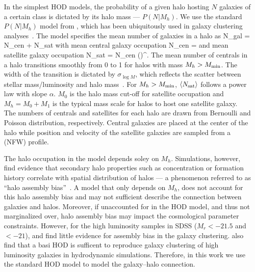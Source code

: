 In the simplest HOD models, the probability of a given halo hosting $N$ galaxies 
of a certain class is dictated by its halo mass --- $P(N|M_h)$.%
We use the standard $P(N|M_h)$ model from \cite{zheng2007}, which has been 
ubiquitously used in galaxy clustering analyses~\citep[\emph{e.g.}][]{sinha2018}. 
The model specifies the mean number of galaxies in a halo as
\beq
\langle N_{\rm gal} \rangle = \langle N_{\rm cen} \rangle + \langle N_{\rm sat} \rangle
\eeq
with mean central galaxy occupation
\beq \label{eq:Ncen}
\langle N_{\rm cen} \rangle  = 
\eeq
and mean satellite galaxy occupation
\beq \label{eq:Nsat}
\langle N_{\rm sat} \rangle = \langle N_{\rm cen} \rangle \bigg(\bigg)^\alpha.
\eeq
The mean number of centrals in a halo transitions smoothly from 0 to 1 for halos 
with mass $M_h > M_{\rm min}$. The width of the transition is dictated by 
$\sigma_{\log M}$, which reflects the scatter between stellar mass/luminosity and 
halo mass~\citep{citecite}. For $M_h > M_{\rm min}$, 
$\langle N_{\rm sat} \rangle$ follows a power law with slope $\alpha$. $M_0$ 
is the halo mass cut-off for satellite occupation and $M_h = M_0 + M_1$ is 
the typical mass scale for halos to host one satellite galaxy. The numbers 
of centrals and satellites for each halo are drawn from Bernoulli and Poisson 
distribution, respectively. Central galaxies are placed at the center of the
halo while position and velocity of the satellite galaxies are sampled from a 
\cite{navarro1997} (NFW) profile. 

The halo occupation in the \cite{zheng2007} model depends soley on $M_h$. 
Simulations, however, find evidence that secondary halo properties such as
concentration or formation history correlate with spatial distribution of
halos --- a phenomenon referred to as ``halo assembly bias''~\citep[\eg~][]{sheth2004,
gao2005, harker2006, wechsler2006, dalal2008, wang2009a, lacerna2014,
contreras2020, hadzhiyska2020}.
A model that only depends on $M_h$, does not account for this halo assembly 
bias and may not sufficient describe the connection between galaxies and 
halos. Moreover, if unaccounted for in the HOD model, and thus not marginalized 
over, halo assembly bias may impact the cosmological parameter constraints. 
However, for the high luminosity samples in SDSS ($M_r < -21.5$  and $<-21$), 
\cite{zentner2016} and \cite{vakili2019} find little evidence for assembly bias 
in the galaxy clustering. \cite{beltz-mohrmann2020} also find that a basi HOD 
is sufficent to reproduce galaxy clustering of high luminosity galaxies in
hydrodynamic simulations. Therefore, in this work we use the standard 
\cite{zheng2007} HOD model to model the galaxy--halo connection. 

